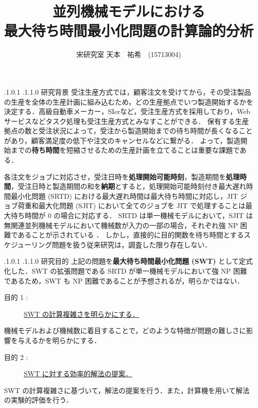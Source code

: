 \documentclass[oneside, 10pt, twocolumn]{jarticle}
\title{\bf{\rm
並列機械モデルにおける\\最大待ち時間最小化問題の計算論的分析}}
\author{宋研究室
\hspace{15pt}
天本　祐希　(15713004)}
\date{}
\makeatletter
\def\section{\@startsection {section}{1}{\z@}{-3.5ex plus -1ex minus
-.2ex}{2.3 ex plus .2ex}{\large\bf}}
\renewcommand{\section}{
\@startsection{section}{1}{\z@}
{.1\Cvs \@plus.0\Cdp \@minus.1\Cdp}%
{.1\Cvs \@plus.1\Cdp \@minus.0\Cdp}%
{\reset@font\large\bfseries}}      %
\makeatother
\begin{document}
\maketitle
\thispagestyle{empty}
\section{研究背景}
受注生産方式では，顧客注文を受けてから，その受注製品の生産を全体の生産計画に組み込むため，どの生産拠点でいつ製造開始するかを決定する．高級自動車メーカー，SIerなど，受注生産方式を採用しており，Web サービスなどタスク処理も受注生産方式とみなすことができる．
保有する生産拠点の数と受注状況によって，受注から製造開始までの待ち時間が長くなることがあり，顧客満足度の低下や注文のキャンセルなどに繋がる．
よって，製造開始までの{\bf 待ち時間}を短縮させるための生産計画を立てることは重要な課題である．

各注文をジョブに対応させ，受注日時を{\bf 処理開始可能時刻}，製造期間を{\bf 処理時間}，受注日時と製造期間の和を{\bf 納期}とすると，処理開始可能時刻付き最大遅れ時間最小化問題 (SRTD) における最大遅れ時間は最大待ち時間に対応し，JIT ジョブ荷重和最大化問題 (SJIT) において全てのジョブを JIT で処理することは最大待ち時間が 0 の場合に対応する． SRTD は単一機械モデルにおいて，SJIT は無関連並列機械モデルにおいて機械数が入力の一部の場合，それぞれ強 NP 困難であることが示されている \cite{SRTD}\cite{SJIT}．
しかし，直接的に目的関数を待ち時間とするスケジューリング問題を扱う従来研究は，調査した限り存在しない．

\section{研究目的}
上記の問題を{\bf 最大待ち時間最小化問題 (SWT) }として定式化した．SWT の拡張問題である SRTD が単一機械モデルにおいて強 NP  困難であるため，SWT も NP 困難であることが予想されるが，明らかではない．
\begin{description}
  \item[目的 1 :]
  \underline{SWT の計算複雑さを明らかにする．}
\end{description}
機械モデルおよび機械数に着目することで，どのような特徴が問題の難しさに影響を与えるかを明らかにする．

\begin{description}
  \item[目的 2 :]
  \underline{SWT に対する効率的解法の提案．}
\end{description}
SWT の計算複雑さに基づいて，解法の提案を行う．また，計算機を用いて解法の実験的評価を行う．
\end{document}
